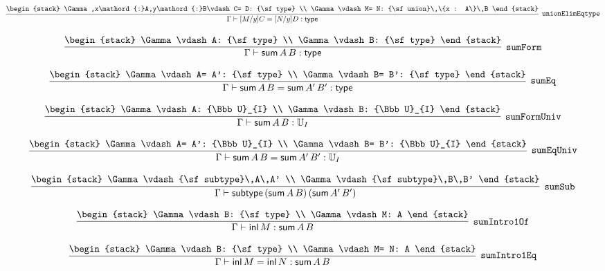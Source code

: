 \[
\infer[{\tt unionElimEqtype}]{\Gamma \vdash [M/y]C= [N/y]D: {\sf type}}{
\begin{stack}
\Gamma ,x\mathord{:}A,y\mathord{:}B\vdash C= D: {\sf type}
\\
\Gamma \vdash M= N: {\sf union}\,\{x : A\}\,B
\end{stack}}
\]

\[
\infer[{\tt sumForm}]{\Gamma \vdash {\sf sum}\,A\,B: {\sf type}}{
\begin{stack}
\Gamma \vdash A: {\sf type}
\\
\Gamma \vdash B: {\sf type}
\end{stack}}
\]

\[
\infer[{\tt sumEq}]{\Gamma \vdash {\sf sum}\,A\,B= {\sf sum}\,A'\,B': {\sf type}}{
\begin{stack}
\Gamma \vdash A= A': {\sf type}
\\
\Gamma \vdash B= B': {\sf type}
\end{stack}}
\]

\[
\infer[{\tt sumFormUniv}]{\Gamma \vdash {\sf sum}\,A\,B: {\Bbb U}_{I}}{
\begin{stack}
\Gamma \vdash A: {\Bbb U}_{I}
\\
\Gamma \vdash B: {\Bbb U}_{I}
\end{stack}}
\]

\[
\infer[{\tt sumEqUniv}]{\Gamma \vdash {\sf sum}\,A\,B= {\sf sum}\,A'\,B': {\Bbb U}_{I}}{
\begin{stack}
\Gamma \vdash A= A': {\Bbb U}_{I}
\\
\Gamma \vdash B= B': {\Bbb U}_{I}
\end{stack}}
\]

\[
\infer[{\tt sumSub}]{\Gamma \vdash {\sf subtype}\,({\sf sum}\,A\,B)\,({\sf sum}\,A'\,B')}{
\begin{stack}
\Gamma \vdash {\sf subtype}\,A\,A'
\\
\Gamma \vdash {\sf subtype}\,B\,B'
\end{stack}}
\]

\[
\infer[{\tt sumIntro1Of}]{\Gamma \vdash {\sf inl}\,M: {\sf sum}\,A\,B}{
\begin{stack}
\Gamma \vdash B: {\sf type}
\\
\Gamma \vdash M: A
\end{stack}}
\]

\[
\infer[{\tt sumIntro1Eq}]{\Gamma \vdash {\sf inl}\,M= {\sf inl}\,N: {\sf sum}\,A\,B}{
\begin{stack}
\Gamma \vdash B: {\sf type}
\\
\Gamma \vdash M= N: A
\end{stack}}
\]

